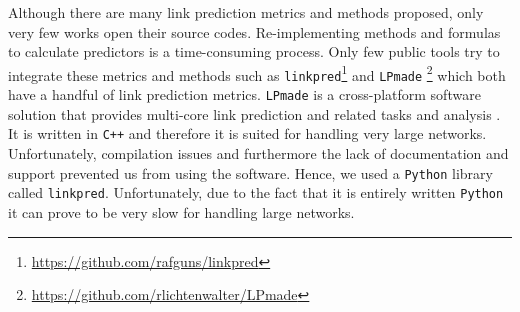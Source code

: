 \documentclass{acm_proc_article-sp}
\begin{document}
	


Although there are many link prediction metrics and methods proposed, only very few works open their source codes. Re-implementing methods and formulas to calculate predictors is a time-consuming process. Only few public tools try to integrate these metrics and methods such as \texttt{linkpred}\footnote{\url{https://github.com/rafguns/linkpred}} and \texttt{LPmade} \footnote{\url{https://github.com/rlichtenwalter/LPmade}} \cite{lichtenwalter2011lpmade} which both have a handful of link prediction metrics. \texttt{LPmade} is a cross-platform software solution that provides multi-core link prediction and related tasks and analysis \cite{lichtenwalter2011lpmade}. It is written in \texttt{C++} and therefore it is suited for handling very large networks. Unfortunately, compilation issues and furthermore the lack of documentation and support prevented us from using the software. Hence, we used a \texttt{Python} library called \texttt{linkpred}. Unfortunately, due to the fact that it is entirely written \texttt{Python} it can prove to be very slow for handling large networks.



\end{document}
